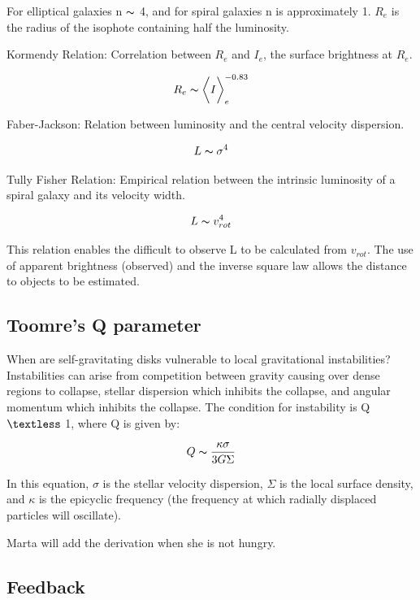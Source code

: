 For elliptical galaxies n $\thicksim$ 4, and for spiral galaxies n is approximately 1.  $R_e$ is the radius of the isophote containing half the luminosity.  

Kormendy Relation:  Correlation between $R_e$ and $I_e$, the surface brightness at $R_e$.  

\begin{equation}
R_e \thicksim \bigg<I\bigg>_e^{-0.83}
\end{equation}

Faber-Jackson:  Relation between luminosity and the central velocity dispersion.

\begin{equation}
L \thicksim \sigma^4
\end{equation}

Tully Fisher Relation:  Empirical relation between the intrinsic luminosity of a spiral galaxy and its velocity width.

\begin{equation}
L \thicksim v_{rot}^4
\end{equation}

This relation enables the difficult to observe L to be calculated from $v_{rot}$.  The use of apparent brightness (observed) and the inverse square law allows the distance to objects to be estimated.  

\subsection{Toomre's Q parameter}

When are self-gravitating disks vulnerable to local gravitational instabilities?  Instabilities can arise from competition between gravity causing over dense regions to collapse, stellar dispersion which inhibits the collapse, and angular momentum which inhibits the collapse.  The condition for instability is Q $\textless$ 1, where Q is given by:

\begin{equation}
Q \thicksim \frac{\kappa \sigma}{3G\Sigma}
\end{equation}

In this equation, $\sigma$ is the stellar velocity dispersion, $\Sigma$ is the local surface density, and $\kappa$ is the epicyclic frequency (the frequency at which radially displaced particles will oscillate).

Marta will add the derivation when she is not hungry.

\subsection{Feedback}




